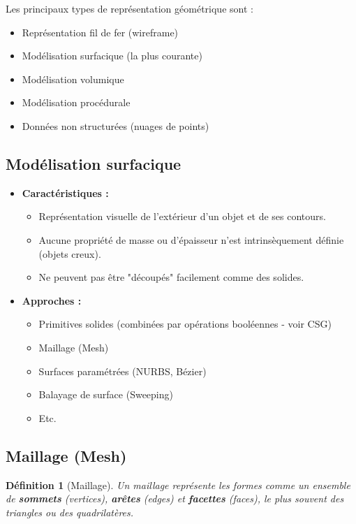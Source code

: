 \documentclass{article}
\newtheorem{definition}{Définition} %
\begin{document}
Les principaux types de représentation géométrique sont :
\begin{itemize}
    \item Représentation fil de fer (wireframe)
    \item Modélisation surfacique (la plus courante)
    \item Modélisation volumique
    \item Modélisation procédurale
    \item Données non structurées (nuages de points)
\end{itemize}

\subsection{Modélisation surfacique}

\begin{itemize}
    \item \textbf{Caractéristiques :}
        \begin{itemize}
            \item Représentation visuelle de l'extérieur d'un objet et de ses contours.
            \item Aucune propriété de masse ou d'épaisseur n'est intrinsèquement définie (objets creux).
            \item Ne peuvent pas être "découpés" facilement comme des solides.
        \end{itemize}
    \item \textbf{Approches :}
        \begin{itemize}
            \item Primitives solides (combinées par opérations booléennes - voir CSG)
            \item Maillage (Mesh)
            \item Surfaces paramétrées (NURBS, Bézier)
            \item Balayage de surface (Sweeping)
            \item Etc.
        \end{itemize}
\end{itemize}

\subsection{Maillage (Mesh)}

\begin{definition}[Maillage]
Un maillage représente les formes comme un ensemble de \textbf{sommets} (vertices), \textbf{arêtes} (edges) et \textbf{facettes} (faces), le plus souvent des triangles ou des quadrilatères.
\end{definition}
\end{document}
